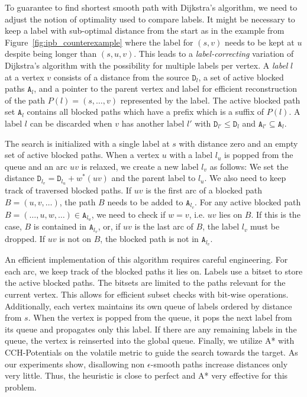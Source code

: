 \documentclass[a4paper,UKenglish,cleveref, autoref, thm-restate]{lipics-v2021}
\begin{document}
To guarantee to find shortest smooth path with Dijkstra's algorithm, we need to adjust the notion of optimality used to compare labels.
It might be necessary to keep a label with sub-optimal distance from the start as in the example from Figure~\ref{fig:ipb_counterexample} where the label for $(s,v)$ needs to be kept at $u$ despite being longer than $(s,u,v)$.
This leads to a \emph{label-correcting} variation of Dijkstra's algorithm with the possibility for multiple labels per vertex.
A \emph{label} $l$ at a vertex $v$ consists of a distance from the source $\mathtt{D}_l$, a set of active blocked paths $\mathtt{A}_l$, and a pointer to the parent vertex and label for efficient reconstruction of the path $P(l) = (s,\dots,v)$ represented by the label.
The active blocked path set $\mathtt{A}_l$ contains all blocked paths which have a prefix which is a suffix of $P(l)$.
A label $l$ can be discarded when $v$ has another label $l'$ with $\mathtt{D}_{l'} \leq \mathtt{D}_l$ and $\mathtt{A}_{l'} \subseteq \mathtt{A}_l$.

The search is initialized with a single label at $s$ with distance zero and an empty set of active blocked paths.
When a vertex $u$ with a label $l_u$ is popped from the queue and an arc $uv$ is relaxed, we create a new label $l_v$ as follows:
We set the distance $\mathtt{D}_{l_v} = \mathtt{D}_{l_u} + w^*(uv)$ and the parent label to $l_u$.
We also need to keep track of traversed blocked paths.
If $uv$ is the first arc of a blocked path $B = (u,v,\dots)$, the path $B$ needs to be added to $\mathtt{A}_{l_v}$.
For any active blocked path $B = (\dots, u, w, \dots) \in \mathtt{A}_{l_u}$, we need to check if $w=v$, i.e. $uv$ lies on $B$.
If this is the case, $B$ is contained in $\mathtt{A}_{l_v}$, or, if $uv$ is the last arc of $B$, the label $l_v$ must be dropped.
If $uv$ is not on $B$, the blocked path is not in $\mathtt{A}_{l_v}$.

An efficient implementation of this algorithm requires careful engineering.
For each arc, we keep track of the blocked paths it lies on.
Labels use a bitset to store the active blocked paths.
The bitsets are limited to the paths relevant for the current vertex.
This allows for efficient subset checks with bit-wise operations.
Additionally, each vertex maintains its own queue of labels ordered by distance from $s$.
When the vertex is popped from the queue, it pops the next label from its queue and propagates only this label.
If there are any remaining labels in the queue, the vertex is reinserted into the global queue.
Finally, we utilize A* with CCH-Potentials on the volatile metric to guide the search towards the target.
As our experiments show, disallowing non $\epsilon$-smooth paths increase distances only very little.
Thus, the heuristic is close to perfect and A* very effective for this problem.
\end{document}
